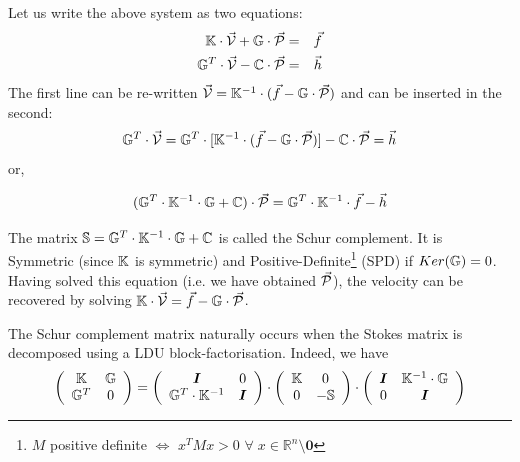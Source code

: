 Let us write the above system as two equations:
\begin{eqnarray}
{\mathbb{K}} \cdot \vec{\cal V} + {\mathbb{G}} \cdot \vec{\cal P} &=& \vec{f} \\
{\mathbb{G}}^T \cdot  \vec{\cal V} - {\mathbb{C}} \cdot \vec{\cal P} &=& \vec{h} 
\end{eqnarray}
The first line can be re-written 
$\vec{\cal V}={\mathbb{K}}^{-1}\cdot (\vec{f} - {\mathbb{G}} \cdot \vec{\cal P})$ and can be inserted in the second:
\begin{equation}
{\mathbb{G}}^T\cdot \vec{\cal V} ={\mathbb{G}}^T \cdot  [ {\mathbb{K}}^{-1} \cdot  (\vec{f} - {\mathbb{G}} \cdot  \vec{\cal P}) ] - {\mathbb{C}}\cdot \vec{\cal P} = \vec{h} 
\end{equation}
or, 
\begin{mdframed}[backgroundcolor=blue!5]
\begin{equation}
({\mathbb{G}}^T \cdot {\mathbb{K}}^{-1} \cdot {\mathbb{G}} + {\mathbb{C}}) \cdot \vec{\cal P} = {\mathbb{G}}^T \cdot {\mathbb{K}}^{-1}\cdot \vec{f} - \vec{h} 
\end{equation}
\end{mdframed}
The matrix ${\mathbb{S}}= {\mathbb{G}}^T \cdot {\mathbb{K}}^{-1} \cdot {\mathbb{G}} + {\mathbb{C}}$ is called the Schur complement. 
It is Symmetric (since ${\mathbb{K}}$ is symmetric) and  Positive-Definite\footnote{$M$ 
positive definite $\iff$ $x^TMx>0$ $\forall \; x\in \mathbb{R}^n \setminus {\bm 0}$ }
(SPD)  if $Ker({{\mathbb{G}}})=0$. 
Having solved this equation (i.e. we have obtained $\vec{\cal P}$), the velocity can be recovered by solving 
${\mathbb{K}}\cdot \vec{\cal V} =\vec{f}- {\mathbb{G}} \cdot \vec{\cal P}$. 

\begin{remark}
The Schur complement matrix naturally occurs when the Stokes matrix is decomposed using 
a LDU block-factorisation. Indeed, we have 
\[
\left(
\begin{array}{cc}
{\mathbb{K}} & {\mathbb{G}} \\ 
{\mathbb{G}}^T & 0
\end{array}
\right)
=
\left(
\begin{array}{cc}
{\bm I} & 0 \\ 
{\mathbb{G}}^T \cdot {\mathbb{K}}^{-1} & {\bm I}
\end{array}
\right)
\cdot
\left(
\begin{array}{cc}
{\mathbb{K}} & 0 \\ 
0 & -{\mathbb{S}}
\end{array}
\right)
\cdot
\left(
\begin{array}{cc}
{\bm I} & {\mathbb{K}}^{-1} \cdot {\mathbb{G}} \\ 
0 & {\bm I}
\end{array}
\right)
\]
\end{remark}

